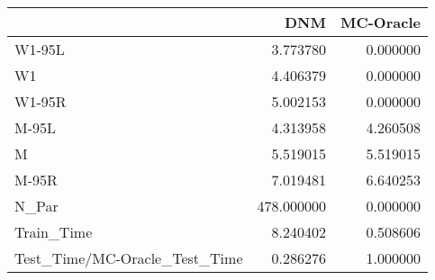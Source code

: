 \begin{tabular}{lrr}
\toprule
{} &         DNM &  MC-Oracle \\
\midrule
W1-95L                        &    3.773780 &   0.000000 \\
W1                            &    4.406379 &   0.000000 \\
W1-95R                        &    5.002153 &   0.000000 \\
M-95L                         &    4.313958 &   4.260508 \\
M                             &    5.519015 &   5.519015 \\
M-95R                         &    7.019481 &   6.640253 \\
N\_Par                         &  478.000000 &   0.000000 \\
Train\_Time                    &    8.240402 &   0.508606 \\
Test\_Time/MC-Oracle\_Test\_Time &    0.286276 &   1.000000 \\
\bottomrule
\end{tabular}
